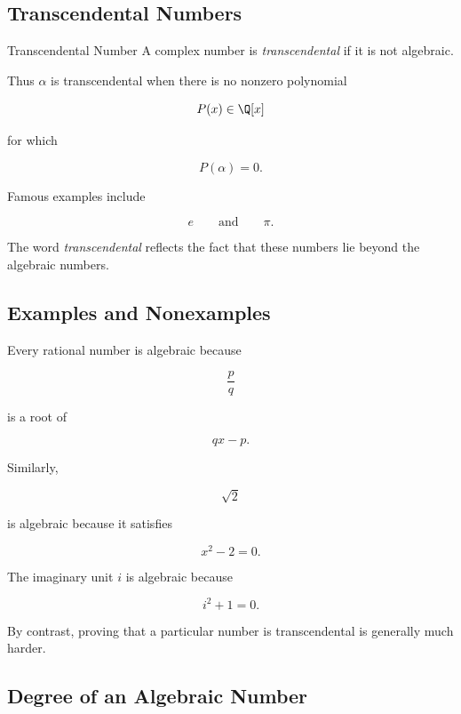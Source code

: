 \subsection{Transcendental Numbers}
\label{subsec:transcendental-numbers}

\begin{definitionbox}{Transcendental Number}
A complex number is \emph{transcendental} if it is not algebraic.
\end{definitionbox}

Thus \(\alpha\) is transcendental when there is no nonzero polynomial

\[ P(x)\in\Q[x] \]

for which

\[ P(\alpha)=0. \]

Famous examples include

\[ \boxed{e\qquad\text{and}\qquad\pi.} \]

The word \emph{transcendental} reflects the fact that these numbers lie
beyond the algebraic numbers.

\subsection{Examples and Nonexamples}
\label{subsec:transcendental-examples-nonexamples}

Every rational number is algebraic because

\[ \frac pq \]

is a root of

\[ qx-p. \]

Similarly,

\[ \sqrt2 \]

is algebraic because it satisfies

\[ x^2-2=0. \]

The imaginary unit \(i\) is algebraic because

\[ i^2+1=0. \]

By contrast, proving that a particular number is transcendental is generally
much harder.

\subsection{Degree of an Algebraic Number}
\label{subsec:algebraic-number-degree-transcendence}

